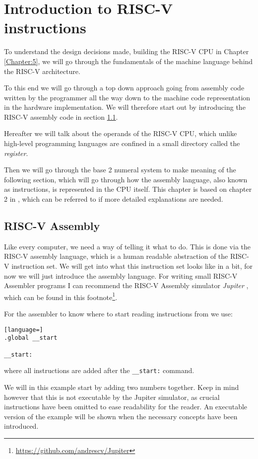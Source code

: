 \chapter{Introduction to RISC-V instructions}
    To understand the design decisions made, building the RISC-V CPU in Chapter \ref{Chapter:5}, we will go through the fundamentals of the machine language behind the RISC-V architecture. 
    
    To this end we will go through a top down approach going from assembly code written by the programmer all the way down to the machine code representation in the hardware implementation. We will therefore start out by introducing the RISC-V assembly code in section \ref{section:RISC-V Asembly}. 
    
    Hereafter we will talk about the operands of the RISC-V CPU, which unlike high-level programming languages are confined in a small directory called the \textit{register}. 
    
    Then we will go through the base 2 numeral system to make meaning of the following section, which will go through how the assembly language, also known as instructions, is represented in the CPU itself. This chapter is based on chapter 2 in \cite{riscVbook}, which can be referred to if more detailed explanations are needed.

\section{RISC-V Assembly}\label{section:RISC-V Asembly}
    Like every computer, we need a way of telling it what to do. This is done via the RISC-V assembly language, which is a human readable abstraction of the RISC-V instruction set. We will get into what this instruction set looks like in a bit, for now we will just introduce the assembly language. For writing small RISC-V Assembler programs I can recommend the RISC-V Assembly simulator \textit{Jupiter} , which can be found in this footnote\footnote{\url{https://github.com/andrescv/Jupiter}}.
    
    For the assembler to know where to start reading instructions from we use:
    
    \begin{lstlisting}[language=]
.global __start

__start:
    \end{lstlisting}
    where all instructions are added after the \texttt{\_\_start:} command.
    
    We will in this example start by adding two numbers together. Keep in mind however that this is not executable by the Jupiter simulator, as crucial instructions have been omitted to ease readability for the reader. An executable version of the example will be shown when the necessary concepts have been introduced.
    
